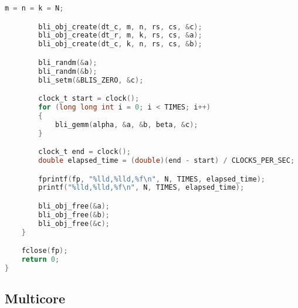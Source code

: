\begin{lstlisting}[language=C]
        m = n = k = N;

        bli_obj_create(dt_c, m, n, rs, cs, &c);
        bli_obj_create(dt_r, m, k, rs, cs, &a);
        bli_obj_create(dt_c, k, n, rs, cs, &b);

        bli_randm(&a);
        bli_randm(&b);
        bli_setm(&BLIS_ZERO, &c);

        clock_t start = clock();
        for (long long int i = 0; i < TIMES; i++)
        {
            bli_gemm(alpha, &a, &b, beta, &c);
        }

        clock_t end = clock();
        double elapsed_time = (double)(end - start) / CLOCKS_PER_SEC;

        fprintf(fp, "%lld,%lld,%f\n", N, TIMES, elapsed_time);
        printf("%lld,%lld,%f\n", N, TIMES, elapsed_time);

        bli_obj_free(&a);
        bli_obj_free(&b);
        bli_obj_free(&c);
    }

    fclose(fp);
    return 0;
}
\end{lstlisting}


\subsection*{Multicore}


